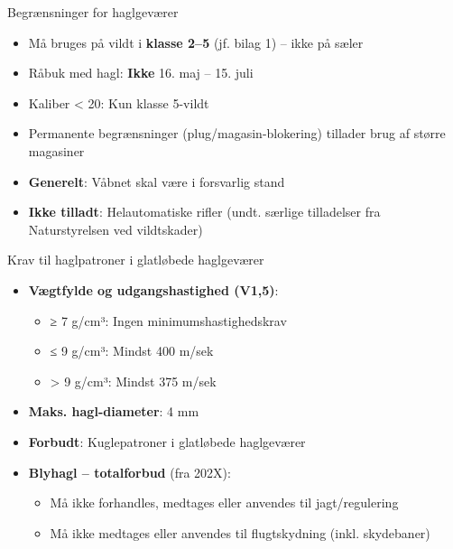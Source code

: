 \begin{frame}{Begrænsninger for haglgeværer}
    \begin{itemize}
        \item Må bruges på vildt i \textbf{klasse 2–5} (jf. bilag 1) – ikke på sæler
        \item Råbuk med hagl: \textbf{Ikke} 16. maj – 15. juli
        \item Kaliber < 20: Kun klasse 5-vildt
        \item Permanente begrænsninger (plug/magasin-blokering) tillader brug af større magasiner
        \item \textbf{Generelt}: Våbnet skal være i forsvarlig stand
        \item \textbf{Ikke tilladt}: Helautomatiske rifler (undt. særlige tilladelser fra Naturstyrelsen ved vildtskader)
    \end{itemize}
\end{frame}

\begin{frame}{Krav til haglpatroner i glatløbede haglgeværer}
    \begin{itemize}
        \item \textbf{Vægtfylde og udgangshastighed (V1,5)}:
          \begin{itemize}
            \item ≥ 7 g/cm³: Ingen minimumshastighedskrav
            \item ≤ 9 g/cm³: Mindst 400 m/sek
            \item > 9 g/cm³: Mindst 375 m/sek
          \end{itemize}
        \item \textbf{Maks. hagl-diameter}: 4 mm
        \item \textbf{Forbudt}: Kuglepatroner i glatløbede haglgeværer
        \item \textbf{Blyhagl – totalforbud} (fra 202X):
          \begin{itemize}
            \item Må ikke forhandles, medtages eller anvendes til jagt/regulering
            \item Må ikke medtages eller anvendes til flugtskydning (inkl. skydebaner)
          \end{itemize}
    \end{itemize}
\end{frame}

